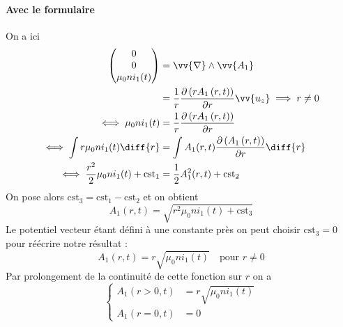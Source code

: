 \paragraph*{Avec le formulaire} On a ici
\begin{equation}
  \begin{split}
    \begin{pmatrix} 0 \\ 0 \\ \mu_0 n i_1(t) \end{pmatrix}
      &= \vv{\nabla} \wedge \vv{A_1}\\
      &= \frac{1}{r} \frac{\partial \left( r A_1\left(r,t \right)\right)}{\partial r} \vv{u_z} \implies r \neq 0\\
      \iff
      \mu_0 n i_1 (t) &= \frac{1}{r} \frac{\partial \left( r A_1\left(r,t \right)\right)}{\partial r}\\
      \iff
      \int r \mu_0 n i_1 (t) \diff{r} &= \int A_1 (r,t) \frac{\partial \left( A_1\left(r,t \right)\right)}{\partial r} \diff{r}\\
      \iff
      \frac{r^2}{2} \mu_0 n i_1 (t) + \text{cst}_1 &= \frac{1}{2} A_1^2 (r,t) + \text{cst}_2
  \end{split}
\end{equation}
On pose alors $\text{cst}_3 = \text{cst}_1 - \text{cst}_2$ et on obtient
\begin{equation}
  A_1(r,t) = \sqrt{r^2 \mu_0 n i_1(t) + \text{cst}_3}
\end{equation}
Le potentiel vecteur étant défini à une constante près on peut choisir $\text{cst}_3 = 0$ pour réécrire notre résultat :
\begin{equation}
  A_1(r,t) = r \sqrt{\mu_0 n i_1(t)}  \quad \text{pour } r \neq 0
\end{equation}
Par prolongement de la continuité de cette fonction sur $r$ on a
\begin{equation}
  \boxed{
  \left\lbrace
  \begin{split}
    A_1 (r > 0,t) &= r \sqrt{\mu_0 n i_1(t)}\\
    A_1 (r = 0,t) &= 0
  \end{split}
  \right.
  }
\end{equation}

